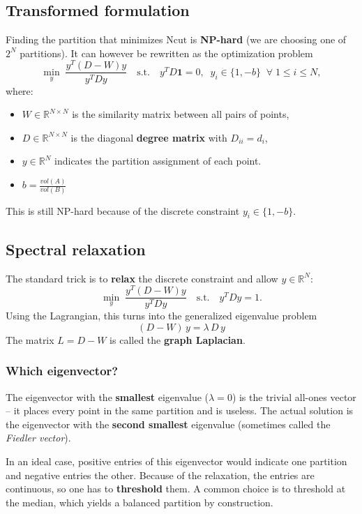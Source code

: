 \subsection{Transformed formulation}
Finding the partition that minimizes $\mathrm{Ncut}$ is \textbf{NP-hard} (we are choosing one
of $2^N$ partitions). It can however be rewritten as the optimization problem
\[
\min_{y} \; \frac{y^T (D - W) y}{y^T D y}
\quad \text{s.t.} \quad
y^T D \mathbf{1} = 0,\;\;
y_i \in \{1, -b\} \;\;\forall\; 1 \leq i \leq N,
\]
where:
\begin{itemize}
  \item $W \in \mathbb{R}^{N \times N}$ is the similarity matrix between all pairs of points,
  \item $D \in \mathbb{R}^{N \times N}$ is the diagonal \textbf{degree matrix} with $D_{ii} = d_i$,
  \item $y \in \mathbb{R}^N$ indicates the partition assignment of each point. 
  \item $b = \frac{vol(A)}{vol(B)}$
\end{itemize}
This is still NP-hard because of the discrete constraint $y_i \in \{1, -b\}$.

\subsection{Spectral relaxation}
The standard trick is to \textbf{relax} the discrete constraint and allow $y \in \mathbb{R}^N$:
\[
\min_{y} \; \frac{y^T (D - W) y}{y^T D y}
\quad \text{s.t.} \quad y^T D y = 1.
\]
Using the Lagrangian, this turns into the generalized eigenvalue problem
\[
\boxed{\, (D - W) \, y = \lambda \, D \, y \,}
\]
The matrix $L = D - W$ is called the \textbf{graph Laplacian}.

\subsubsection{Which eigenvector?}
The eigenvector with the \textbf{smallest} eigenvalue ($\lambda = 0$) is the trivial all-ones
vector -- it places every point in the same partition and is useless. The actual solution is
the eigenvector with the \textbf{second smallest} eigenvalue (sometimes called the
\emph{Fiedler vector}).

In an ideal case, positive entries of this eigenvector would indicate one partition and
negative entries the other. Because of the relaxation, the entries are continuous, so one has
to \textbf{threshold} them. A common choice is to threshold at the median, which yields a
balanced partition by construction.

